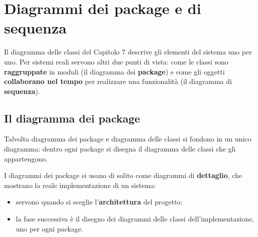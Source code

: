 \chapter{Diagrammi dei package e di sequenza}

Il diagramma delle classi del Capitolo 7 descrive gli elementi del sistema uno per uno. Per sistemi reali servono altri due punti
di vista: come le classi sono \textbf{raggruppate} in moduli (il diagramma dei \textbf{package}) e come gli oggetti
\textbf{collaborano nel tempo} per realizzare una funzionalità (il diagramma di \textbf{sequenza}).

\section{Il diagramma dei package}


Talvolta diagramma dei package e diagramma delle classi si fondono in un unico diagramma: dentro ogni package si disegna il
diagramma delle classi che gli appartengono.

I diagrammi dei package si usano di solito come diagrammi di \textbf{dettaglio}, che mostrano la reale implementazione di un
sistema:
\begin{itemize}
  \item servono quando si sceglie l'\textbf{architettura} del progetto;
  \item la fase successiva è il disegno dei diagrammi delle classi dell'implementazione, uno per ogni package.
\end{itemize}

